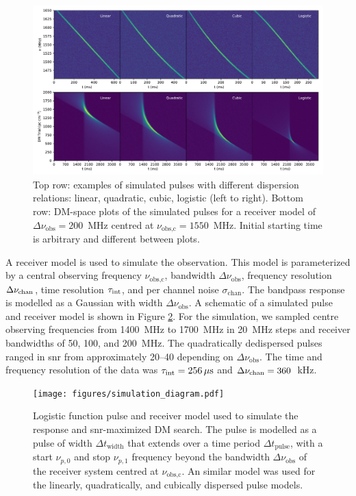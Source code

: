 \documentclass[a4paper,fleqn,usenatbib]{mnras}
\begin{document}
\begin{figure}
    \includegraphics[width=1.0\linewidth]{figures/sim_pulse_spectra_dm.pdf}
    \caption{Top row: examples of simulated pulses with different dispersion
    relations: linear, quadratic, cubic, logistic (left to right). Bottom row:
    DM-space plots of the simulated pulses for a receiver model of $\Delta
    \nu_{\textrm{obs}} = 200$~MHz centred at $\nu_{\textrm{obs,c}} = 1550$~MHz.
    Initial starting time is arbitrary and different between plots.
    }
    \label{fig:sim_pulse_spectra_dm}
\end{figure}

A receiver model is used to simulate the observation. This model is
parameterized by a central observing frequency $\nu_{\textrm{obs,c}}$, bandwidth
$\Delta \nu_{\textrm{obs}}$, frequency resolution $\Delta \nu_{\rm chan}$, time
resolution $\tau_{\rm int}$, and per channel noise $\sigma_{\textrm{chan}}$. The
bandpass response is modelled as a Gaussian with width $\Delta
\nu_{\textrm{obs}}$. A schematic of a simulated pulse and receiver model is
shown in Figure \ref{fig:simulation_diagram}. For the simulation, we sampled
centre observing frequencies from 1400~MHz to 1700~MHz in 20~MHz steps and
receiver bandwidths of 50, 100, and 200~MHz. The quadratically dedispersed
pulses ranged in \gls{snr} from approximately 20--40 depending on $\Delta
\nu_{\textrm{obs}}$. The time and frequency resolution of the data was
$\tau_{\rm int} = 256\,\mu \textrm{s}$ and $\Delta \nu_{\rm chan} = 360$~kHz.

\begin{figure}
    \texttt{[image: figures/simulation\_diagram.pdf]}
    \caption{Logistic function pulse and receiver model used to simulate the
    response and \gls{snr}-maximized DM search. The pulse is modelled as a pulse
    of width $\Delta t_{\textrm{width}}$ that extends over a time period $\Delta
    t_{\textrm{pulse}}$, with a start $\nu_{p,0}$ and stop $\nu_{p,1}$ frequency
    beyond the bandwidth $\Delta \nu_{\textrm{obs}}$ of the receiver system
    centred at $\nu_{\textrm{obs,c}}$. An similar model was used for the
    linearly, quadratically, and cubically dispersed pulse models.
    }
    \label{fig:simulation_diagram}
\end{figure}
\end{document}
